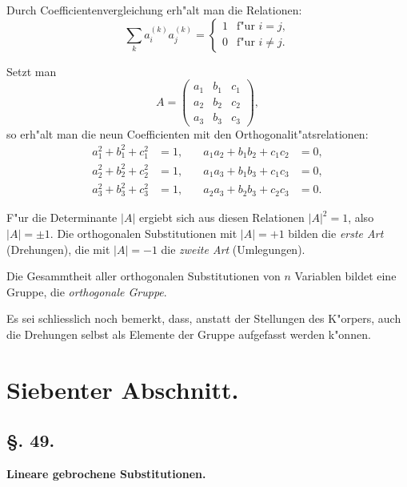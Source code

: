 \documentclass[12pt,a4paper]{article}
\theoremstyle{weber}
\begin{document}
Durch Coefficientenvergleichung erh"alt man die Relationen:
\begin{equation}\label{eq:3}
\sum_k a_i^{(k)} a_j^{(k)} = \begin{cases} 1 & \text{f"ur } i = j, \\ 0 & \text{f"ur } i \neq j. \end{cases}
\end{equation}

Setzt man
\[
A = \begin{pmatrix}
a_1 & b_1 & c_1 \\
a_2 & b_2 & c_2 \\
a_3 & b_3 & c_3
\end{pmatrix},
\]
so erh"alt man die neun Coefficienten mit den Orthogonalit"atsrelationen:
\begin{equation}\label{eq:4}
\begin{aligned}
a_1^2 + b_1^2 + c_1^2 &= 1, &\quad a_1a_2 + b_1b_2 + c_1c_2 &= 0, \\
a_2^2 + b_2^2 + c_2^2 &= 1, &\quad a_1a_3 + b_1b_3 + c_1c_3 &= 0, \\
a_3^2 + b_3^2 + c_3^2 &= 1, &\quad a_2a_3 + b_2b_3 + c_2c_3 &= 0.
\end{aligned}
\end{equation}

F"ur die Determinante $|A|$ ergiebt sich aus diesen Relationen $|A|^2 = 1$, also $|A| = \pm 1$. Die orthogonalen Substitutionen mit $|A| = +1$ bilden die \textit{erste Art} (Drehungen), die mit $|A| = -1$ die \textit{zweite Art} (Umlegungen).

Die Gesammtheit aller orthogonalen Substitutionen von $n$ Variablen bildet eine Gruppe, die \textit{orthogonale Gruppe}.

Es sei schliesslich noch bemerkt, dass, anstatt der Stellungen des K"orpers, auch die Drehungen selbst als Elemente der Gruppe aufgefasst werden k"onnen.


\newpage
\section*{Siebenter Abschnitt.}

\subsection*{\S. 49.}

\begin{center}
\textbf{Lineare gebrochene Substitutionen.}
\end{center}
\end{document}
